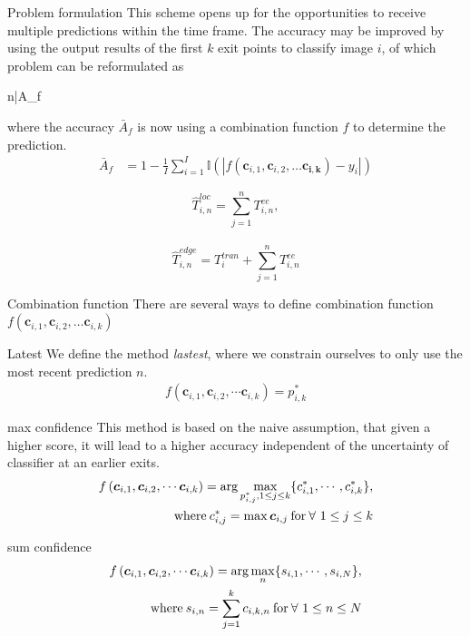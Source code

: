 \begin{enumdescript}
		\item[Problem formulation] 
		This scheme opens up for the opportunities to receive multiple predictions within the time frame. The accuracy may be improved by using the output results of the first $ k $ exit points to classify image $ i $, of which problem can be reformulated as
		\begin{maxi}
			{n}{\bar{A}_f}
			{}{}
		\end{maxi}
		where the accuracy $ \bar{A}_f $ is now using a combination function $ f $ to determine the prediction.
		\begin{align*}
		\bar{A}_f &= 1 - \frac{1}{I} \sum_{i=1}^{I}\mathbb{I}\left(\left|f\left(\mathbf{c}_{i,1}, \mathbf{c}_{i,2}, \dots \mathbf{c_{i,k}}\right)-y_i\right|\right)
		\end{align*}
		
		$$\hat{T}_{i,n}^{loc}=\sum_{j=1}^{n} T^{ee}_{i,n}, $$ \\
		$$\hat{T}_{i,n}^{edge}=T_{i}^{tran}+\sum_{j=1}^{n} T^{ee}_{i,n}$$
		
			\item[Combination function] There are several ways to define combination function $ f\left(\mathbf{c}_{i,1}, \mathbf{c}_{i,2}, \dots \mathbf{c}_{i,k}\right) $
		\begin{enumdescript}
		
			
				\item[Latest] We define the method \emph{lastest}, where we constrain ourselves to only use the most recent prediction $n$.
				\begin{align}
					f\left(\bm{c}_{i,1}, \bm{c}_{i,2}, \cdots \bm{c}_{i,k} \right) = p_{i,k}^{*}
				\end{align}
				
				\item[max confidence] This method is based on the naive assumption, that given a higher score, it will lead to a higher accuracy independent of the uncertainty of classifier at an earlier exits.
				\begin{align}
				\begin{split}
				f\left(\bm{c}_{i,1}, \bm{c}_{i,2}, \cdots \bm{c}_{i,k} \right) = \arg \underset{{p_{i,j}^{*}, 1 \le j 
						\le k}}{\max} \{c_{i,1}^*, \cdots, c_{i,k}^*\},\\ \text{where\:} c_{i,j}^* = \max\bm{c}_{i,j} \text{\:for\:} \forall \ 1 \le j \le k
				\end{split}	
				\end{align}
				\item[sum confidence]
				\begin{align}
				\begin{split}
				f\left(\bm{c}_{i,1}, \bm{c}_{i,2}, \cdots \bm{c}_{i,k} \right) = \arg \underset{n}{\max} \{s_{i,1}, \cdots, s_{i,N}\}, \\ \text{where\:} s_{i,n} = \sum_{j=1}^{k}c_{i,k,n} \text{\:for\:} \forall \ 1\le n \le N
				\end{split}
				\end{align}


\end{enumdescript}
\end{enumdescript}
